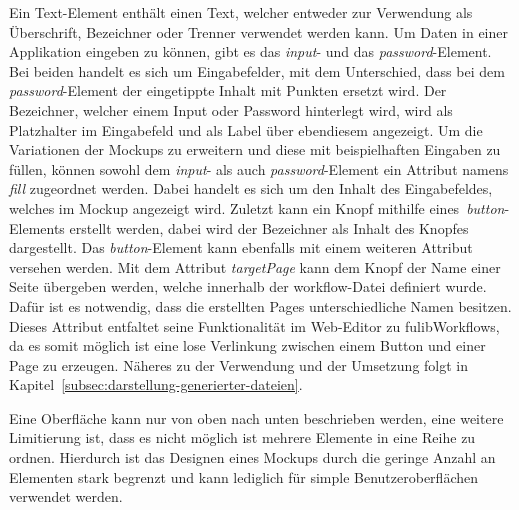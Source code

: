 Ein Text-Element enthält einen Text, welcher entweder zur Verwendung als Überschrift, Bezeichner oder Trenner verwendet werden kann.
Um Daten in einer Applikation eingeben zu können, gibt es das \textit{input}- und das \textit{password}-Element.
Bei beiden handelt es sich um Eingabefelder, mit dem Unterschied, dass bei dem \textit{password}-Element der eingetippte Inhalt mit Punkten ersetzt wird.
Der Bezeichner, welcher einem Input oder Password hinterlegt wird, wird als Platzhalter im Eingabefeld und als Label über ebendiesem angezeigt.
Um die Variationen der Mockups zu erweitern und diese mit beispielhaften Eingaben zu füllen, können sowohl dem \textit{input}- als auch \textit{password}-Element
ein Attribut namens \textit{fill} zugeordnet werden.
Dabei handelt es sich um den Inhalt des Eingabefeldes, welches im Mockup angezeigt wird.
Zuletzt kann ein Knopf mithilfe eines~\textit{button}-Elements erstellt werden, dabei wird der Bezeichner als Inhalt des Knopfes dargestellt.
Das \textit{button}-Element kann ebenfalls mit einem weiteren Attribut versehen werden.
Mit dem Attribut \textit{targetPage} kann dem Knopf der Name einer Seite übergeben werden, welche innerhalb der workflow-Datei definiert wurde.
Dafür ist es notwendig, dass die erstellten Pages unterschiedliche Namen besitzen.
Dieses Attribut entfaltet seine Funktionalität im Web-Editor zu fulibWorkflows, da es somit möglich ist eine lose Verlinkung zwischen einem Button und einer Page
zu erzeugen.
Näheres zu der Verwendung und der Umsetzung folgt in Kapitel~\ref{subsec:darstellung-generierter-dateien}.

Eine Oberfläche kann nur von oben nach unten beschrieben werden, eine weitere Limitierung ist, dass es nicht möglich ist mehrere Elemente in eine Reihe zu ordnen.
Hierdurch ist das Designen eines Mockups durch die geringe Anzahl an Elementen stark begrenzt und kann lediglich für
simple Benutzeroberflächen verwendet werden.
